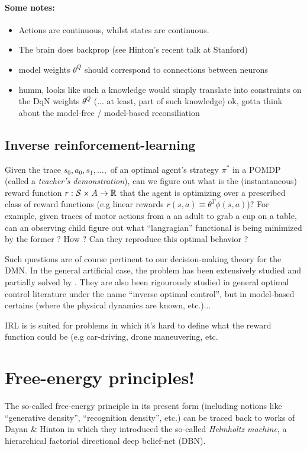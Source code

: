 \documentclass[10pt,letterpaper]{article}
\begin{document}
\paragraph*{Some notes:}
\begin{itemize}
  \item Actions are continuous, whilst states are continuous.
  \item The brain does backprop (see Hinton's recent talk at Stanford)
  \item model weights $\theta^Q$ should correspond to connections between neurons
\item humm, looks like such a knowledge would simply translate into constraints on the DqN weights $\theta^Q$ (... at least, part of such knowledge)
  ok, gotta think about the model-free / model-based reconsiliation
\end{itemize}

\subsection{Inverse reinforcement-learning}
  Given the trace $s_0,a_0,s_1,\ldots,$ of an optimal agent's strategy $\pi^*$ in
  a POMDP (called a \textit{teacher's demonstration}), can we figure out what is the
  (instantaneous) reward function $r: \mathcal S \times \mathcal \mathcal A
  \rightarrow \mathbb R$ that the agent is optimizing over a prescribed class of reward functions
  (e.g linear rewards $r(s,a) \equiv \theta^T\phi(s,a)$)?
  For example, given traces of motor actions from a an adult to grab a cup on a table,
  can an observing child figure out what ``langragian'' functional is being minimized by the former ?
  How ? Can they reproduce this optimal behavior ?

Such questions are of course pertinent to our decision-making theory for the DMN.
In the general artificial case, the problem has been extensively studied and partially solved by
\cite{abbeel2004}. They are also been rigourously studied in general optimal control literature under the name ``inverse optimal control'', but in model-based certains (where the physical dynamics
are known, etc.)...

IRL is is suited for problems in which it's hard to define what the reward function could be
(e.g car-driving, drone maneuvering, etc.

\section{Free-energy principles!}
The so-called free-energy principle in its present form (including notions like ``generative density'', ``recognition density'', etc.) can be traced back to works of Dayan \& Hinton \citep{dayan1995helmholtz} in which they introduced the so-called \textit{Helmholtz machine}, a hierarchical factorial directional deep belief-net (DBN).
\end{document}
